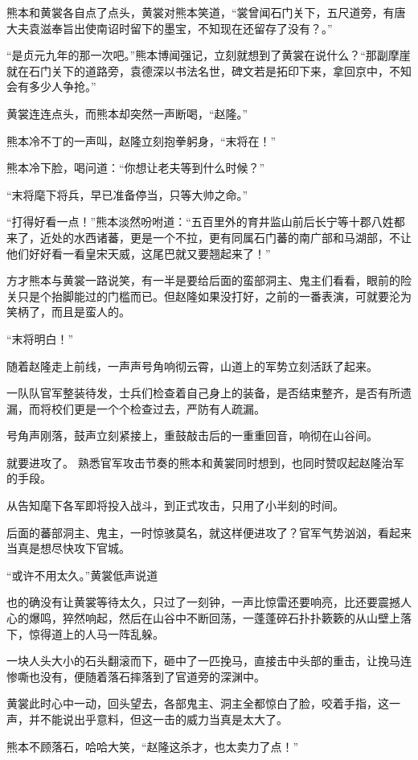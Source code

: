 熊本和黄裳各自点了点头，黄裳对熊本笑道，“裳曾闻石门关下，五尺道旁，有唐大夫袁滋奉旨出使南诏时留下的墨宝，不知现在还留存了没有？。”

“是贞元九年的那一次吧。”熊本博闻强记，立刻就想到了黄裳在说什么？“那副摩崖就在石门关下的道路旁，袁德深以书法名世，碑文若是拓印下来，拿回京中，不知会有多少人争抢。”

黄裳连连点头，而熊本却突然一声断喝，“赵隆。”

熊本冷不丁的一声叫，赵隆立刻抱拳躬身，“末将在！”

熊本冷下脸，喝问道：“你想让老夫等到什么时候？”

“末将麾下将兵，早已准备停当，只等大帅之命。”

“打得好看一点！”熊本淡然吩咐道：“五百里外的育井监山前后长宁等十郡八姓都来了，近处的水西诸蕃，更是一个不拉，更有同属石门蕃的南广部和马湖部，不让他们好好看一看皇宋天威，这尾巴就又要翘起来了！”

方才熊本与黄裳一路说笑，有一半是要给后面的蛮部洞主、鬼主们看看，眼前的险关只是个抬脚能过的门槛而已。但赵隆如果没打好，之前的一番表演，可就要沦为笑柄了，而且是蛮人的。

“末将明白！”

随着赵隆走上前线，一声声号角响彻云霄，山道上的军势立刻活跃了起来。

一队队官军整装待发，士兵们检查着自己身上的装备，是否结束整齐，是否有所遗漏，而将校们更是一个个检查过去，严防有人疏漏。

号角声刚落，鼓声立刻紧接上，重鼓敲击后的一重重回音，响彻在山谷间。

就要进攻了。
熟悉官军攻击节奏的熊本和黄裳同时想到，也同时赞叹起赵隆治军的手段。

从告知麾下各军即将投入战斗，到正式攻击，只用了小半刻的时间。

后面的蕃部洞主、鬼主，一时惊骇莫名，就这样便进攻了？官军气势汹汹，看起来当真是想尽快攻下官城。

“或许不用太久。”黄裳低声说道

也的确没有让黄裳等待太久，只过了一刻钟，一声比惊雷还要响亮，比还要震撼人心的爆鸣，猝然响起，然后在山谷中不断回荡，一蓬蓬碎石扑扑簌簌的从山壁上落下，惊得道上的人马一阵乱躲。

一块人头大小的石头翻滚而下，砸中了一匹挽马，直接击中头部的重击，让挽马连惨嘶也没有，便随着落石摔落到了官道旁的深渊中。

黄裳此时心中一动，回头望去，各部鬼主、洞主全都惊白了脸，咬着手指，这一声，并不能说出乎意料，但这一击的威力当真是太大了。

熊本不顾落石，哈哈大笑，“赵隆这杀才，也太卖力了点！”

